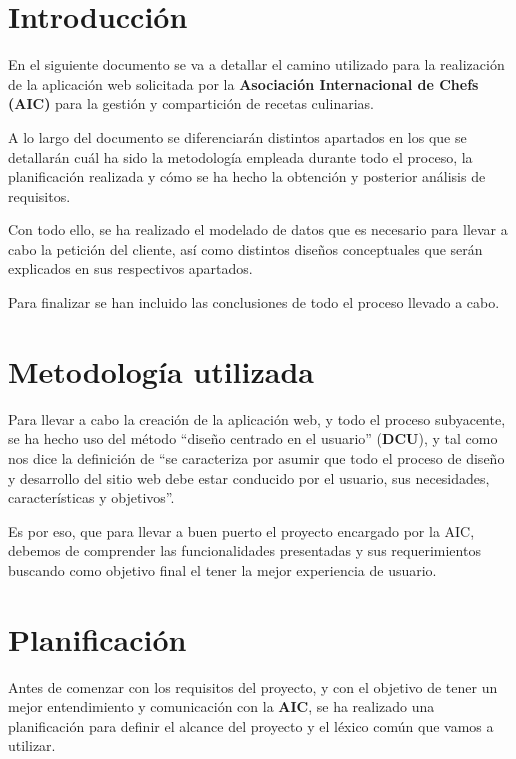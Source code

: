 \documentclass{\ClassPath/viu-tfm-template}
\begin{document}
    \graphicspath{{../../VIU_TFM_LaTeX_template/}}

    \coverpage

    \tableofcontents

\chapter{Introducción}
En el siguiente documento se va a detallar el camino utilizado para la realización de la aplicación web solicitada por la  \textbf{Asociación Internacional de Chefs (AIC)} para la gestión y compartición de recetas culinarias.

A lo largo del documento se diferenciarán distintos apartados en los que se detallarán cuál ha sido la metodología empleada durante todo el proceso, la planificación realizada y cómo se ha hecho la obtención y posterior análisis de requisitos.

Con todo ello, se ha realizado el modelado de datos que es necesario para llevar a cabo la petición del cliente, así como distintos diseños conceptuales que serán explicados en sus respectivos apartados.

Para finalizar se han incluido las conclusiones de todo el proceso llevado a cabo.


\chapter{Metodología utilizada}
Para llevar a cabo la creación de la aplicación web, y todo el proceso subyacente, se ha hecho uso del método “diseño centrado en el usuario” (\textbf{DCU}), y tal como nos dice la definición de \textcite{hassan2004diseno} “se caracteriza por asumir que todo el proceso de diseño y desarrollo del sitio web debe estar conducido por el usuario, sus necesidades, características y objetivos”.

Es por eso, que para llevar a buen puerto el proyecto encargado por la AIC, debemos de comprender las funcionalidades presentadas y sus requerimientos buscando como objetivo final el tener la mejor experiencia de usuario.

\chapter{Planificación}
Antes de comenzar con los requisitos del proyecto, y con el objetivo de tener un mejor entendimiento y comunicación con la \textbf{AIC}, se ha realizado una planificación para definir el alcance del proyecto y el léxico común que vamos a utilizar.
\end{document}
